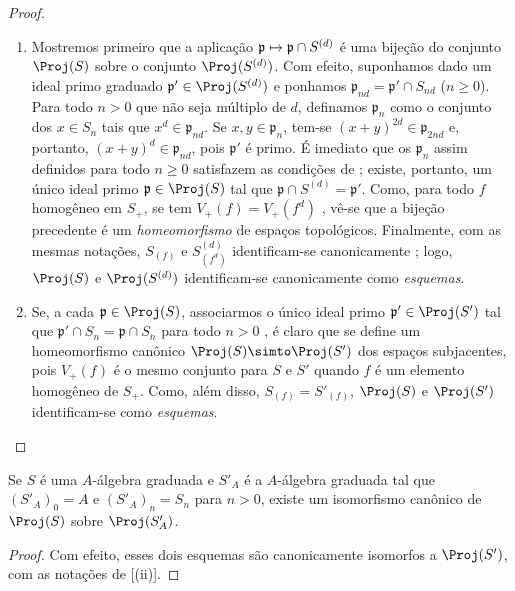 \documentclass[oneside,10pt]{amsart}
\makeatletter
\renewcommand{\geq}{\geqslant}
\newcommand{\ega@arrow}[2]{\mathchoice{#1}{#2}{#2}{#2}}
\let\ega@shortmapsto\mapsto
\renewcommand{\mapsto}{\ega@arrow{\longmapsto}{\ega@shortmapsto}}
\let\EGAOriginalLabel\label
\renewcommand{\label}[1]{\phantomsection\EGAOriginalLabel{#1}}
\makeatother
\begin{document}
\begin{proof}
\medskip\noindent
\begin{enumerate}
  \item[\rm(i)] Mostremos primeiro que a aplicação $\mathfrak{p}\mapsto\mathfrak{p}\cap S^{(d)}$ é uma bijeção do conjunto $\Proj(S)$ sobre o conjunto $\Proj(S^{(d)})$.
  Com efeito, suponhamos dado um ideal primo graduado $\mathfrak{p}'\in\Proj(S^{(d)})$ e ponhamos $\mathfrak{p}_{nd}=\mathfrak{p}'\cap S_{nd}$ ($n\geq0$).
  Para todo $n>0$ que não seja múltiplo de $d$, definamos $\mathfrak{p}_n$ como o conjunto dos $x\in S_n$ tais que $x^d\in\mathfrak{p}_{nd}$.
  Se $x,y\in\mathfrak{p}_n$, tem-se $(x+y)^{2d}\in\mathfrak{p}_{2nd}$ e, portanto, $(x+y)^d\in\mathfrak{p}_{nd}$, pois $\mathfrak{p}'$ é primo.
  É imediato que os $\mathfrak{p}_n$ assim definidos para todo $n\geq0$ satisfazem as condições de ; existe, portanto, um único ideal primo $\mathfrak{p}\in\Proj(S)$ tal que $\mathfrak{p}\cap S^{(d)}=\mathfrak{p}'$.
  Como, para todo $f$ homogêneo em $S_+$, se tem $V_+(f)=V_+(f^d)$ , vê-se que a bijeção precedente é um \emph{homeomorfismo} de espaços topológicos.
  Finalmente, com as mesmas notações, $S_{(f)}$ e $S^{(d)}_{(f^d)}$ identificam-se canonicamente ; logo, $\Proj(S)$ e $\Proj(S^{(d)})$ identificam-se canonicamente como \emph{esquemas}.
  \item[\rm(ii)] Se, a cada $\mathfrak{p}\in\Proj(S)$, associarmos o único ideal primo $\mathfrak{p}'\in\Proj(S')$ tal que $\mathfrak{p}'\cap S_n=\mathfrak{p}\cap S_n$ para todo $n>0$ , é claro que se define um homeomorfismo canônico $\Proj(S)\simto\Proj(S')$ dos espaços subjacentes, pois $V_+(f)$ é o mesmo conjunto para $S$ e $S'$ quando $f$ é um elemento homogêneo de $S_+$.
  Como, além disso, $S_{(f)}=S'_{(f)}$, $\Proj(S)$ e $\Proj(S')$ identificam-se como \emph{esquemas}.
\end{enumerate}
\end{proof}

\begin{corollary}[2.4.8]
\label{II.2.4.8}
Se $S$ é uma $A$-álgebra graduada e $S'_A$ é a $A$-álgebra graduada tal que $(S'_A)_0=A$ e $(S'_A)_n=S_n$ para $n>0$, existe um isomorfismo canônico de $\Proj(S)$ sobre $\Proj(S'_A)$.
\end{corollary}

\begin{proof}
Com efeito, esses dois esquemas são canonicamente isomorfos a $\Proj(S')$, com as notações de [(ii)].
\end{proof}
\end{document}
